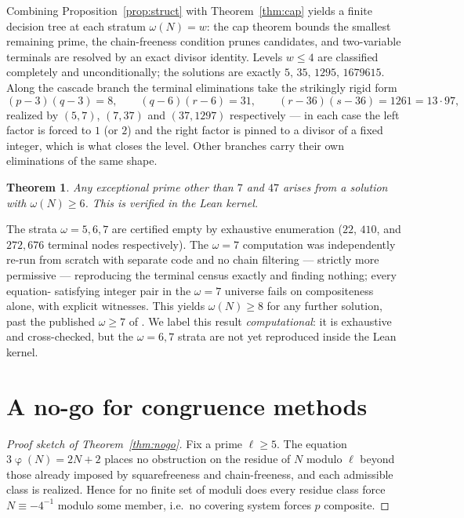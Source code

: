 \documentclass[11pt,reqno]{amsart}
\theoremstyle{plain}
\newtheorem{theorem}{Theorem}[section]
\theoremstyle{definition}
\DeclareMathOperator{\tot}{\varphi}
\begin{document}
Combining Proposition~\ref{prop:struct} with Theorem~\ref{thm:cap} yields a finite decision
tree at each stratum $\omega(N)=w$: the cap theorem bounds the smallest remaining prime, the
chain-freeness condition prunes candidates, and two-variable terminals are resolved by an exact
divisor identity. Levels $w\le4$ are classified completely and unconditionally; the solutions
are exactly $5,\,35,\,1295,\,1679615$. Along the cascade branch the terminal eliminations take
the strikingly rigid form
\[
  (p-3)(q-3)=8,\qquad (q-6)(r-6)=31,\qquad (r-36)(s-36)=1261=13\cdot 97,
\]
realized by $(5,7)$, $(7,37)$ and $(37,1297)$ respectively --- in each case the left factor is
forced to $1$ (or $2$) and the right factor is pinned to a divisor of a fixed integer, which is
what closes the level. Other branches carry their own eliminations of the same shape.

\begin{theorem}\label{thm:w6}
Any exceptional prime other than $7$ and $47$ arises from a solution with $\omega(N)\ge6$.
This is verified in the Lean kernel.
\end{theorem}

\noindent The strata $\omega=5,6,7$ are certified empty by exhaustive enumeration
($22$, $410$, and $272{,}676$ terminal nodes respectively). The $\omega=7$ computation was
independently re-run from scratch with separate code and no chain filtering --- strictly more
permissive --- reproducing the terminal census exactly and finding nothing; every equation-
satisfying integer pair in the $\omega=7$ universe fails on compositeness alone, with explicit
witnesses. This yields $\omega(N)\ge8$ for any further solution, past the published $\omega\ge7$
of \cite{Herch}. We label this result \emph{computational}: it is exhaustive and cross-checked,
but the $\omega=6,7$ strata are not yet reproduced inside the Lean kernel.

\section{A no-go for congruence methods}\label{sec:nogo}

\begin{proof}[Proof sketch of Theorem~\ref{thm:nogo}]
Fix a prime $\ell\ge5$. The equation $3\tot(N)=2N+2$ places no obstruction on the residue of
$N$ modulo $\ell$ beyond those already imposed by squarefreeness and chain-freeness, and each
admissible class is realized. Hence for no finite set of moduli does every residue class force
$N\equiv-4^{-1}$ modulo some member, i.e.\ no covering system forces $p$ composite.
\end{proof}
\end{document}
